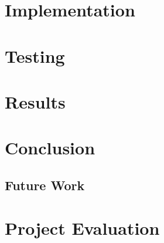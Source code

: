 \documentclass[12pt]{article}
\begin{document}
\section{Implementation}\label{implementation}
\section{Testing}\label{teting}
\section{Results}\label{results}
\section{Conclusion}\label{conclusion}
\subsection{Future Work}\label{future}
\section{Project Evaluation}\label{evaluation}



\end{document}

